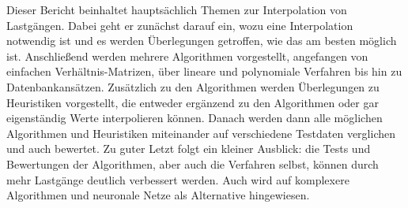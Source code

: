 
Dieser Bericht beinhaltet hauptsächlich Themen zur Interpolation von Lastgängen. Dabei geht er zunächst darauf ein, wozu eine Interpolation notwendig ist und es werden Überlegungen getroffen, wie das am besten möglich ist. Anschließend werden mehrere Algorithmen vorgestellt, angefangen von einfachen Verhältnis-Matrizen, über lineare und polynomiale Verfahren bis hin zu Datenbankansätzen. Zusätzlich zu den Algorithmen werden Überlegungen zu Heuristiken vorgestellt, die entweder ergänzend zu den Algorithmen oder gar eigenständig Werte interpolieren können. Danach werden dann alle möglichen Algorithmen und Heuristiken miteinander auf verschiedene Testdaten verglichen und auch bewertet. Zu guter Letzt folgt ein kleiner Ausblick: die Tests und Bewertungen der Algorithmen, aber auch die Verfahren selbst, können durch mehr Lastgänge deutlich verbessert werden. Auch wird auf komplexere Algorithmen und neuronale Netze als Alternative hingewiesen.